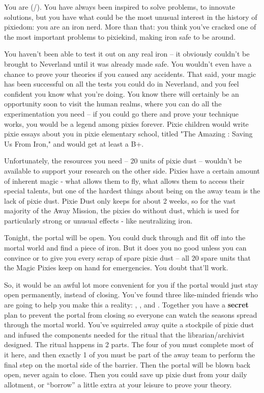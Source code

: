 \documentclass[char]{PP}
\begin{document}
\name{\cMIron{}}

You are \cMIron{} (\cMIron{\they}/\cMIron{\them}).  You have always been inspired to solve problems, to innovate solutions, but you have what could be the most unusual interest in the history of pixiedom: you are an iron nerd.  More than that: you think you've cracked one of the most important problems to pixiekind, making iron safe to be around.

You haven't been able to test it out on any real iron – it obviously couldn't be brought to Neverland until it was already made safe.  You wouldn't even have a chance to prove your theories if you caused any accidents.  That said, your magic has been successful on all the tests you could do in Neverland, and you feel confident you know what you're doing.  You know there will certainly be an opportunity soon to visit the human realms, where you can do all the experimentation you need – if you could go there and prove your technique works, you would be a legend among pixies forever.  Pixie children would write pixie essays about you in pixie elementary school, titled "The Amazing \cMIron{}: Saving Us From Iron," and would get at least a B+.

Unfortunately, the resources you need – 20 units of pixie dust – wouldn’t be available to support your research on the other side. Pixies have a certain amount of inherent magic - what allows them to fly, what allows them to access their special talents, but one of the hardest things about being on the away team is the lack of pixie dust. Pixie Dust only keeps for about 2 weeks, so for the vast majority of the Away Mission, the pixies do without dust, which is used for particularly strong or unusual effects - like neutralizing iron.

Tonight, the portal will be open. You could duck through and flit off into the mortal world and find a piece of iron. But it does you no good unless you can convince \cMHead{} or \cMTree{} to give you every scrap of spare pixie dust -- all 20 spare units that the Magic Pixies keep on hand for emergencies. You doubt that’ll work.

So, it would be an awful lot more convenient for you if the portal would just stay open permanently, instead of closing. You’ve found three like-minded friends who are going to help you make this a reality: \cSLibrarian{}, \cFHeart{}, and \cESweet{}. Together you have a \textbf{secret} plan to prevent the portal from closing so everyone can watch the seasons spread through the mortal world. You’ve squirreled away quite a stockpile of pixie dust and infused the components needed for the ritual that the librarian/archivist designed. The ritual happens in 2 parts. The four of you must complete most of it here, and then exactly 1 of you must be part of the away team to perform the final step on the mortal side of the barrier. Then the portal will be blown back open, never again to close. Then you could save up pixie dust from your daily allotment, or “borrow” a little extra at your leisure to prove your theory.
\end{document}
